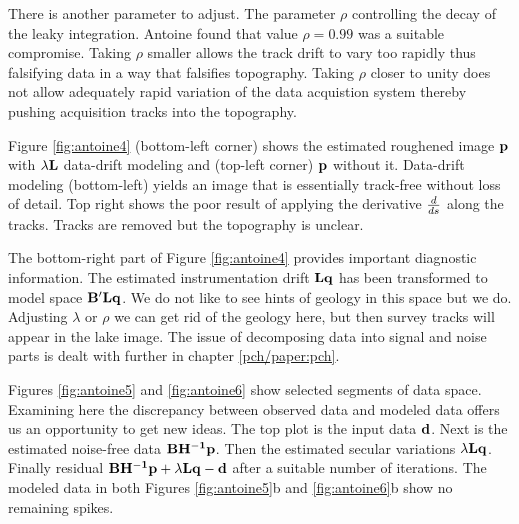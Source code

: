 \par
There is another parameter to adjust.
The parameter $\rho$ controlling the decay of the leaky integration. 
Antoine found that value ${\rho=0.99}$ was a suitable compromise.
Taking $\rho$ smaller allows the track drift to vary too rapidly thus
falsifying data in a way that falsifies topography.
Taking $\rho$ closer to unity does not allow adequately rapid variation
of the data acquistion system
thereby pushing acquisition tracks into the topography.

\par
Figure \ref{fig:antoine4}
(bottom-left corner)
shows the estimated roughened image ${\bf p}$
with $\lambda\bold L$ data-drift modeling and
(top-left corner) ${\bf p}$ without it.
Data-drift modeling (bottom-left)
yields an image that is essentially track-free without loss of detail.
Top right shows the poor result of applying 
the derivative $d \over ds$ along the tracks.
Tracks are removed but the topography is unclear.

\par
The bottom-right part of
Figure \ref{fig:antoine4} provides important diagnostic information.
The estimated instrumentation drift $\bold L\bold q$ has been transformed
to model space $\bold B'\bold L\bold q$.
We do not like to see hints of geology in this space but we do.
Adjusting $\lambda$ or $\rho$ we can get rid of the geology here,
but then survey tracks will appear in the lake image.
The issue of decomposing data into signal and noise parts
is dealt with further in chapter \ref{pch/paper:pch}.

\par
Figures \ref{fig:antoine5} and \ref{fig:antoine6} show
selected segments of data space.
Examining here the discrepancy between observed data and modeled data
offers us an opportunity to get new ideas.
The top plot is the input data $\bold{d}$.
Next is the estimated noise-free data ${\bf BH^{-1}p}$.
Then the estimated secular variations $\lambda \bold L \bold q$.
Finally residual
$\bold B \bold {H^{-1}} \bold p + \lambda \bold L \bold q - \bold d$
after a suitable number of iterations.
The modeled data in both Figures \ref{fig:antoine5}b and 
\ref{fig:antoine6}b show no remaining spikes.

